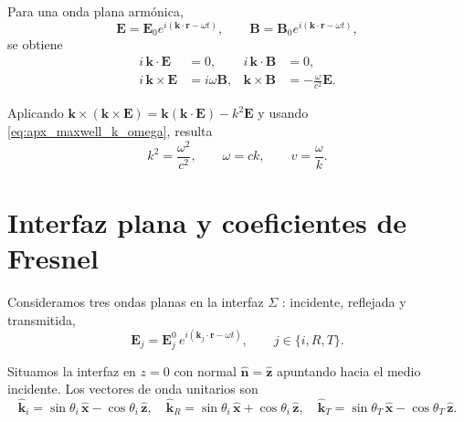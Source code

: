 Para una onda plana armónica,
\begin{equation}
\mathbf E = \mathbf E_0 e^{i(\mathbf k\cdot\mathbf r-\omega t)},
\qquad
\mathbf B = \mathbf B_0 e^{i(\mathbf k\cdot\mathbf r-\omega t)},
\label{eq:apx_ansatz_onda_plana}
\end{equation}
se obtiene
\begin{equation}
\begin{aligned}
i\,\mathbf k\cdot\mathbf E &= 0,
& i\,\mathbf k\cdot\mathbf B &= 0,\\
i\,\mathbf k\times\mathbf E &= i\omega\mathbf B,
& \mathbf k\times\mathbf B &= -\frac{\omega}{c^2}\mathbf E.
\end{aligned}
\label{eq:apx_maxwell_k_omega}
\end{equation}

Aplicando $\mathbf k\times(\mathbf k\times\mathbf E)=\mathbf k(\mathbf k\cdot\mathbf E)-k^2\mathbf E$ y usando \eqref{eq:apx_maxwell_k_omega}, resulta
\begin{equation}
k^2 = \frac{\omega^2}{c^2},
\qquad
\omega = ck,
\qquad
v = \frac{\omega}{k}.
\label{eq:apx_dispersion}
\end{equation}

\section{Interfaz plana y coeficientes de Fresnel}
\label{subsec:apx_fresnel}

Consideramos tres ondas planas en la interfaz $\Sigma$ \cite{bornwolf1999}: incidente, reflejada y transmitida,
\begin{equation}
\mathbf{E}_j = \mathbf{E}_j^0\, e^{i(\mathbf{k}_j\cdot\mathbf{r} - \omega t)},
\qquad j\in\{i,R,T\}.
\label{eq:apx_campos_iRT}
\end{equation}

Situamos la interfaz en $z=0$ con normal $\hat{\mathbf{n}} = \hat{\mathbf{z}}$ apuntando hacia el medio incidente. Los vectores de onda unitarios son
\begin{equation}
\hat{\mathbf{k}}_i = \sin\theta_i\,\hat{\mathbf{x}} - \cos\theta_i\,\hat{\mathbf{z}},
\quad
\hat{\mathbf{k}}_R = \sin\theta_i\,\hat{\mathbf{x}} + \cos\theta_i\,\hat{\mathbf{z}},
\quad
\hat{\mathbf{k}}_T = \sin\theta_T\,\hat{\mathbf{x}} - \cos\theta_T\,\hat{\mathbf{z}}.
\label{eq:apx_kvectors}
\end{equation}

